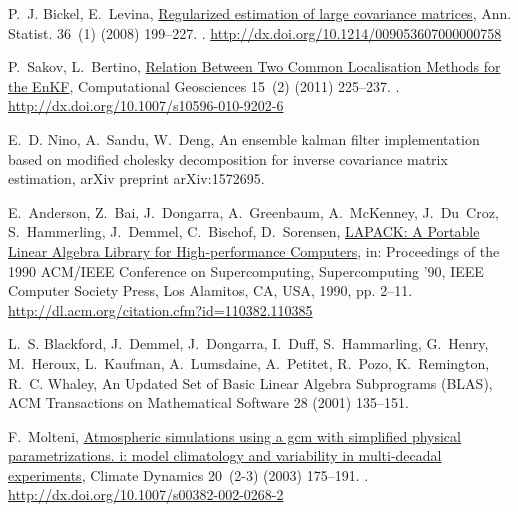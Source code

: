 \documentclass[12pt]{article}
\begin{document}
\begin{thebibliography}{10}
P.~J. Bickel, E.~Levina,
  \href{http://dx.doi.org/10.1214/009053607000000758}{Regularized estimation of
  large covariance matrices}, Ann. Statist. 36~(1) (2008) 199--227.
\newblock \href {http://dx.doi.org/10.1214/009053607000000758}
  {}.
\newline\urlprefix\url{http://dx.doi.org/10.1214/009053607000000758}

P.~Sakov, L.~Bertino,
  \href{http://dx.doi.org/10.1007/s10596-010-9202-6}{{Relation Between Two
  Common Localisation Methods for the EnKF}}, Computational Geosciences 15~(2)
  (2011) 225--237.
\newblock \href {http://dx.doi.org/10.1007/s10596-010-9202-6}
  {}.
\newline\urlprefix\url{http://dx.doi.org/10.1007/s10596-010-9202-6}

E.~D. Nino, A.~Sandu, W.~Deng, An ensemble kalman filter implementation based
  on modified cholesky decomposition for inverse covariance matrix estimation,
  arXiv preprint arXiv:1572695.

E.~Anderson, Z.~Bai, J.~Dongarra, A.~Greenbaum, A.~McKenney, J.~Du~Croz,
  S.~Hammerling, J.~Demmel, C.~Bischof, D.~Sorensen,
  \href{http://dl.acm.org/citation.cfm?id=110382.110385}{{LAPACK: A Portable
  Linear Algebra Library for High-performance Computers}}, in: Proceedings of
  the 1990 ACM/IEEE Conference on Supercomputing, Supercomputing '90, IEEE
  Computer Society Press, Los Alamitos, CA, USA, 1990, pp. 2--11.
\newline\urlprefix\url{http://dl.acm.org/citation.cfm?id=110382.110385}

L.~S. Blackford, J.~Demmel, J.~Dongarra, I.~Duff, S.~Hammarling, G.~Henry,
  M.~Heroux, L.~Kaufman, A.~Lumsdaine, A.~Petitet, R.~Pozo, K.~Remington, R.~C.
  Whaley, {An Updated Set of Basic Linear Algebra Subprograms (BLAS)}, {ACM
  Transactions on Mathematical Software} 28 (2001) 135--151.

F.~Molteni, \href{http://dx.doi.org/10.1007/s00382-002-0268-2}{Atmospheric
  simulations using a gcm with simplified physical parametrizations. i: model
  climatology and variability in multi-decadal experiments}, Climate Dynamics
  20~(2-3) (2003) 175--191.
\newblock \href {http://dx.doi.org/10.1007/s00382-002-0268-2}
  {}.
\newline\urlprefix\url{http://dx.doi.org/10.1007/s00382-002-0268-2}


\end{thebibliography}
\end{document}
